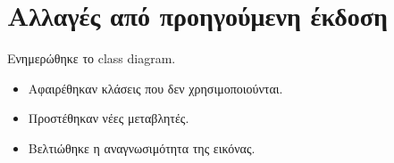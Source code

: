 \section*{Αλλαγές από προηγούμενη έκδοση}

Ενημερώθηκε το class diagram.
\begin{itemize}

\item Αφαιρέθηκαν κλάσεις που δεν χρησιμοποιούνται.
\item Προστέθηκαν νέες μεταβλητές.
\item Βελτιώθηκε η αναγνωσιμότητα της εικόνας.

\end{itemize}

\clearpage